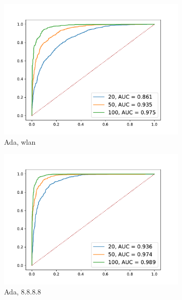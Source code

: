 \documentclass[12pt,a4paper,automark, toc=bib]{scrreprt}
\theoremstyle{definition}
\begin{document}
\begin{figure}
\begin{subfigure}{0.32\linewidth}
					\includegraphics[width=\linewidth]{figures/md5_wlan_AdaBoost.pdf}
					\caption{Ada, wlan}
				\end{subfigure}
				\begin{subfigure}{0.32\linewidth}
					\centering
					\includegraphics[width=\linewidth]{figures/md5_8.8.8.8_AdaBoost.pdf}
					\caption{Ada, 8.8.8.8}
				\end{subfigure}
				\begin{subfigure}{0.32\linewidth}
					\centering

\end{subfigure}
\end{figure}
\end{document}
